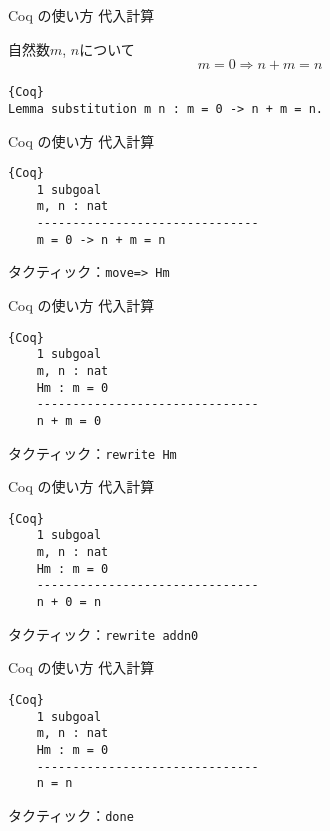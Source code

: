 \documentclass[dvipdfmx,cjk]{beamer}
\theoremstyle{mystyle}
\newcommand{\0}{\textbf{0}}
\begin{document}
\begin{frame}[fragile]{Coq の使い方 代入計算}
	\begin{screen}
	自然数$m$, $n$について
	\[
		m = 0 \Longrightarrow n + m = n
	\]
	\end{screen} \pause
	\begin{lstlisting}{Coq}
Lemma substitution m n : m = 0 -> n + m = n. \end{lstlisting}
\end{frame}

\begin{frame}[fragile]{Coq の使い方 代入計算}
	\begin{screen}
		\begin{lstlisting}{Coq}
    1 subgoal
    m, n : nat
    -------------------------------
    m = 0 -> n + m = n \end{lstlisting}
	\end{screen} \pause
	タクティック：{\tt move=> Hm}
\end{frame}

\begin{frame}[fragile]{Coq の使い方 代入計算}
	\begin{screen}
	\begin{lstlisting}{Coq}
    1 subgoal
    m, n : nat
    Hm : m = 0
    -------------------------------
    n + m = 0 \end{lstlisting}
    \end{screen} \pause
    タクティック：{\tt rewrite Hm}
\end{frame}

\begin{frame}[fragile]{Coq の使い方 代入計算}
	\begin{screen}
		\begin{lstlisting}{Coq}
    1 subgoal
    m, n : nat
    Hm : m = 0
    -------------------------------
    n + 0 = n \end{lstlisting}
	\end{screen} \pause
	タクティック：{\tt rewrite addn0}
\end{frame}

\begin{frame}[fragile]{Coq の使い方 代入計算}
	\begin{screen}
		\begin{lstlisting}{Coq}
    1 subgoal
    m, n : nat
    Hm : m = 0
    -------------------------------
    n = n \end{lstlisting}
	\end{screen} \pause
	タクティック：{\tt done}
\end{frame}
\end{document}
